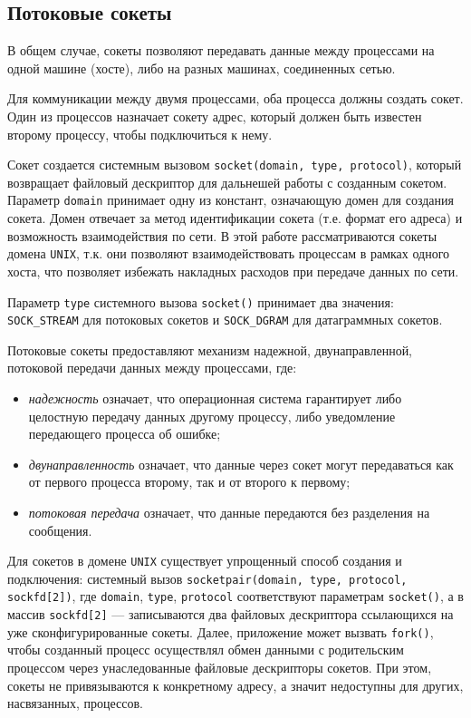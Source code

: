 \documentclass[14pt, russian]{scrartcl}
\begin{document}
\subsection{Потоковые сокеты}

В общем случае, сокеты позволяют передавать данные между процессами на одной
машине (хосте), либо на разных машинах, соединенных сетью.

Для коммуникации между двумя процессами, оба процесса должны создать сокет. Один
из процессов назначает сокету адрес, который должен быть известен второму
процессу, чтобы подключиться к нему.

Сокет создается системным вызовом \verb|socket(domain, type, protocol)|, который
возвращает файловый дескриптор для дальнешей работы с созданным сокетом.
Параметр \verb|domain| принимает одну из констант, означающую домен для создания
сокета. Домен отвечает за метод идентификации сокета (т.е. формат его адреса) и
возможность взаимодействия по сети. В этой работе рассматриваются сокеты домена
\verb|UNIX|, т.к. они позволяют взаимодействовать процессам в рамках одного
хоста, что позволяет избежать накладных расходов при передаче данных по сети.

Параметр \verb|type| системного вызова \verb|socket()| принимает два значения:
\verb|SOCK_STREAM| для потоковых сокетов и \verb|SOCK_DGRAM| для датаграммных
сокетов.

Потоковые сокеты предоставляют механизм надежной, двунаправленной, потоковой
передачи данных между процессами, где:

\begin{itemize}
  \item \emph{надежность} означает, что операционная система гарантирует либо
        целостную передачу данных другому процессу, либо уведомление передающего
        процесса об ошибке;
  \item \emph{двунаправленность} означает, что данные через сокет могут
        передаваться как от первого процесса второму, так и от второго к
        первому;
  \item \emph{потоковая передача} означает, что данные передаются без разделения
        на сообщения.
\end{itemize}

Для сокетов в домене \verb|UNIX| существует упрощенный способ создания и
подключения: системный вызов
\verb|socketpair(domain, type, protocol, sockfd[2])|, где \verb|domain|,
\verb|type|, \verb|protocol| соответствуют параметрам \verb|socket()|, а в
массив \verb|sockfd[2]| --- записываются два файловых дескриптора ссылающихся на
уже сконфигурированные сокеты. Далее, приложение может вызвать \verb|fork()|,
чтобы созданный процесс осуществлял обмен данными с родительским процессом через
унаследованные файловые дескрипторы сокетов. При этом, сокеты не привязываются к
конкретному адресу, а значит недоступны для других, насвязанных, процессов.
\end{document}
